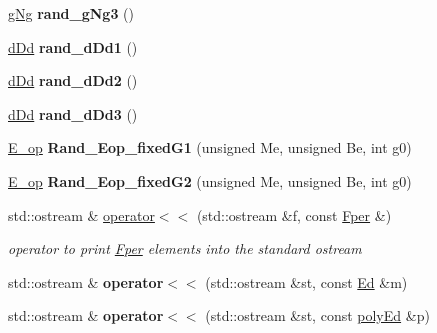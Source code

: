 \begin{DoxyCompactItemize}
\mbox{\hyperlink{classetvo_i_i_1_1g_ng}{g\+Ng}} {\bfseries rand\+\_\+g\+Ng3} ()
\item 
\mbox{\label{namespaceetvo_i_i_adefb0dc685027b97bbc91441fd10bb8a}} 
\mbox{\hyperlink{classetvo_i_i_1_1d_dd}{d\+Dd}} {\bfseries rand\+\_\+d\+Dd1} ()
\item 
\mbox{\label{namespaceetvo_i_i_a26f7f4157780567b3f5589db5c4bd5de}} 
\mbox{\hyperlink{classetvo_i_i_1_1d_dd}{d\+Dd}} {\bfseries rand\+\_\+d\+Dd2} ()
\item 
\mbox{\label{namespaceetvo_i_i_a4d0d22e6695eba0ebd83de5792cea770}} 
\mbox{\hyperlink{classetvo_i_i_1_1d_dd}{d\+Dd}} {\bfseries rand\+\_\+d\+Dd3} ()
\item 
\mbox{\label{namespaceetvo_i_i_a6b681e2eb7d5692ed0f2a285e56111a4}} 
\mbox{\hyperlink{classetvo_i_i_1_1_e__op}{E\+\_\+op}} {\bfseries Rand\+\_\+\+Eop\+\_\+fixed\+G1} (unsigned Me, unsigned Be, int g0)
\item 
\mbox{\label{namespaceetvo_i_i_a4488ecbc105e92ee64dc41badfaf91ab}} 
\mbox{\hyperlink{classetvo_i_i_1_1_e__op}{E\+\_\+op}} {\bfseries Rand\+\_\+\+Eop\+\_\+fixed\+G2} (unsigned Me, unsigned Be, int g0)
\item 
std\+::ostream \& \mbox{\hyperlink{namespaceetvo_i_i_a462212bcba4cc820676526d88ddbfb87}{operator$<$$<$}} (std\+::ostream \&f, const \mbox{\hyperlink{classetvo_i_i_1_1_fper}{Fper}} \&)
\begin{DoxyCompactList}\small\item\em operator to print \mbox{\hyperlink{classetvo_i_i_1_1_fper}{Fper}} elements into the standard ostream \end{DoxyCompactList}\item 
\mbox{\label{namespaceetvo_i_i_a5cbede937a49cfe2f4676e44a0b64c54}} 
std\+::ostream \& {\bfseries operator$<$$<$} (std\+::ostream \&st, const \mbox{\hyperlink{classetvo_i_i_1_1_ed}{Ed}} \&m)
\item 
\mbox{\label{namespaceetvo_i_i_ab12162e23583bd82bec7f8cf7e3456ab}} 
std\+::ostream \& {\bfseries operator$<$$<$} (std\+::ostream \&st, const \mbox{\hyperlink{classetvo_i_i_1_1poly_ed}{poly\+Ed}} \&p)

\end{DoxyCompactItemize}
